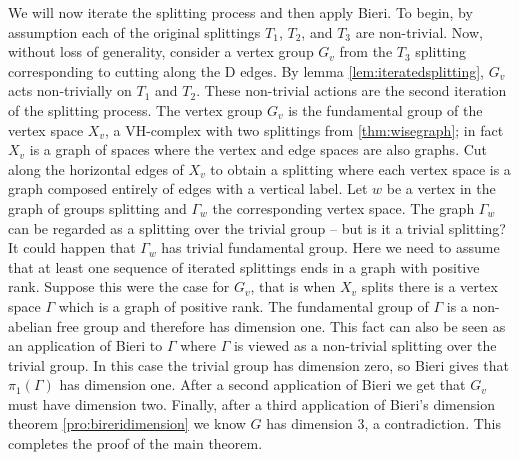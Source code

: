 \documentclass[12pt,parskip=full]{report}
\theoremstyle{plain}
\theoremstyle{definition}
\begin{document}
We will now iterate the splitting process and then apply Bieri. To begin, by assumption each of the original splittings \(T_1\), \(T_2\), and \(T_3\) are non-trivial. Now, without loss of generality, consider a vertex group \(G_v\) from the \(T_3\) splitting corresponding to cutting along the D edges. By lemma \ref{lem:iteratedsplitting}, \(G_v\) acts non-trivially on \(T_1\) and \(T_2\). These non-trivial actions are the second iteration of the splitting process. The vertex group \(G_v\) is the fundamental group of  the vertex space \(X_v\), a VH-complex with two splittings from \ref{thm:wisegraph}; in fact \(X_v\) is a graph of spaces where the vertex and edge spaces are also graphs. Cut along the horizontal edges of \(X_v\) to obtain a splitting where each vertex space is a graph composed entirely of edges with a vertical label. Let \(w\) be a vertex in the graph of groups splitting and \(\Gamma_w\) the corresponding vertex space. The graph \(\Gamma_w\) can be regarded as a splitting over the trivial group -- but is it a trivial splitting? It could happen that \(\Gamma_w\) has trivial fundamental group. Here we need to assume that at least one sequence of iterated splittings ends in a graph with positive rank. Suppose this were the case for \(G_v\), that is when \(X_v\) splits there is a vertex space \(\Gamma\) which is a graph of positive rank. The fundamental group of \(\Gamma\) is a non-abelian free group and therefore has dimension one. This fact can also be seen as an application of Bieri to \(\Gamma\) where \(\Gamma\) is viewed as a non-trivial splitting over the trivial group. In this case the trivial group has dimension zero, so Bieri gives that \(\pi_1(\Gamma)\) has dimension one. After a second application of Bieri we get that \(G_v\) must have dimension two. Finally, after a third application of Bieri's dimension theorem \ref{pro:bireridimension} we know \(G\) has dimension 3, a contradiction. This completes the proof of the main theorem.



\noindent

\cleardoublepage



% 

% 




\end{document}
